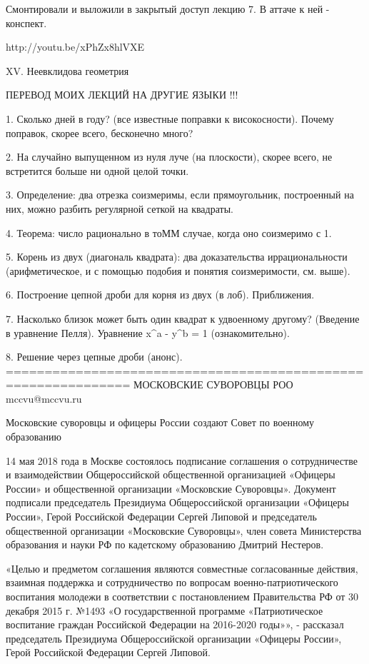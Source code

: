 Смонтировали и выложили в закрытый доступ  лекцию 7. В аттаче к ней - конспект. 
 
http://youtu.be/xPhZx8hlVXE 

XV. Неевклидова геометрия

ПЕРЕВОД МОИХ ЛЕКЦИЙ НА ДРУГИЕ ЯЗЫКИ !!!

1. Сколько дней в году? (все известные поправки к високосности).
Почему поправок, скорее всего, бесконечно много?

2. На случайно выпущенном из нуля луче (на плоскости),
скорее всего, не встретится больше ни одной целой точки.

3. Определение: два отрезка соизмеримы, если прямоугольник,
построенный на них, можно разбить регулярной сеткой на квадраты.

4. Теорема: число рационально в тоММ случае, когда оно соизмеримо с 1.

5. Корень из двух (диагональ квадрата): два доказательства иррациональности
(арифметическое, и с помощью подобия и понятия соизмеримости, см. выше).

6. Построение цепной дроби для корня из двух (в лоб). Приближения.

7. Насколько близок может быть один квадрат к удвоенному другому?
(Введение в уравнение Пелля). Уравнение x^a - y^b = 1 (ознакомительно).

8. Решение через цепные дроби (анонс).
==============================================================
МОСКОВСКИЕ СУВОРОВЦЫ РОО
mccvu@mccvu.ru

 Московские суворовцы и офицеры России создают Совет по военному образованию

14 мая 2018 года в Москве состоялось подписание соглашения о сотрудничестве и взаимодействии Общероссийской общественной организацией «Офицеры России» и общественной организации «Московские Суворовцы». Документ подписали председатель Президиума Общероссийской организации «Офицеры России», Герой Российской Федерации Сергей Липовой и председатель общественной организации «Московские Суворовцы», член совета Министерства образования и науки РФ по кадетскому образованию Дмитрий Нестеров.

«Целью и предметом соглашения являются совместные согласованные действия, взаимная поддержка и сотрудничество по вопросам военно-патриотического воспитания молодежи в соответствии с постановлением Правительства РФ от 30 декабря 2015 г. №1493 «О государственной программе «Патриотическое воспитание граждан Российской Федерации на 2016-2020 годы»», - рассказал председатель Президиума Общероссийской организации «Офицеры России», Герой Российской Федерации Сергей Липовой. 

